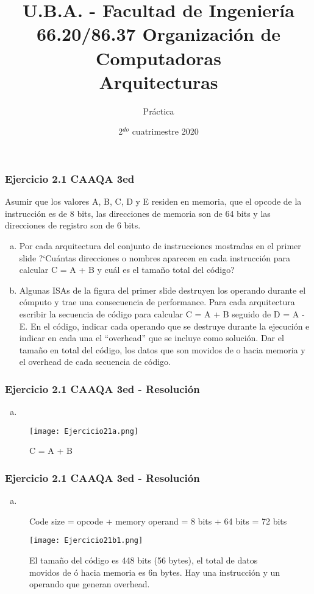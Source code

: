 \documentclass{beamer}
\title[66.20/86.37]{U.B.A. - Facultad de Ingeniería\\\vspace{0.25cm} 66.20/86.37 Organización de Computadoras
\\Arquitecturas}
\author{Práctica}
\date{2$^{do}$ cuatrimestre 2020}
\begin{document}
\begin{frame}
\titlepage %
\end{frame}

\begin{frame}
 \frametitle{Ejercicio 2.1 CAAQA 3ed}
 
Asumir que los valores A, B, C, D y E residen en memoria, que el opcode de la instrucción es de 8 bits, las direcciones de memoria son de 64 bits y las direcciones de registro son de 6 bits.

\begin{enumerate}[a.]
 \item Por cada arquitectura del conjunto de instrucciones mostradas en el primer slide ?`Cuántas direcciones o nombres aparecen en cada instrucción para calcular  C = A + B y cuál es el tamaño total del código?

 \item Algunas ISAs de la figura del primer slide destruyen los operando durante el cómputo y trae una consecuencia de performance. Para cada arquitectura escribir la secuencia de código para calcular C = A + B seguido de D = A - E. En el código, indicar cada operando que se destruye durante la ejecución e indicar en cada una el “overhead”  que se incluye como solución. Dar el tamaño en total del código, los datos que son movidos de o hacia memoria y el overhead de cada secuencia de código.
\end{enumerate}
\end{frame}

\begin{frame}
 \frametitle{Ejercicio 2.1 CAAQA 3ed - Resolución}
 \begin{enumerate}[a.]
 \item
\end{enumerate}
\begin{center}
\begin{figure}
 \texttt{[image: Ejercicio21a.png]}
\caption*{C = A + B}
\end{figure}
\end{center}
 \end{frame}

\begin{frame}
 \frametitle{Ejercicio 2.1 CAAQA 3ed - Resolución}
 \begin{enumerate}[b.]
 \item
\end{enumerate}
\begin{center}

\begin{figure}
\caption*{Code size = opcode + memory  operand = 8 bits + 64 bits = 72 bits}
 \texttt{[image: Ejercicio21b1.png]}
\caption*{El tamaño del código es 448 bits (56 bytes), el total de datos movidos de ó hacia memoria es  6n bytes. Hay una instrucción y un operando que generan overhead.}
\end{figure}

\end{center}
 \end{frame}
\end{document}
